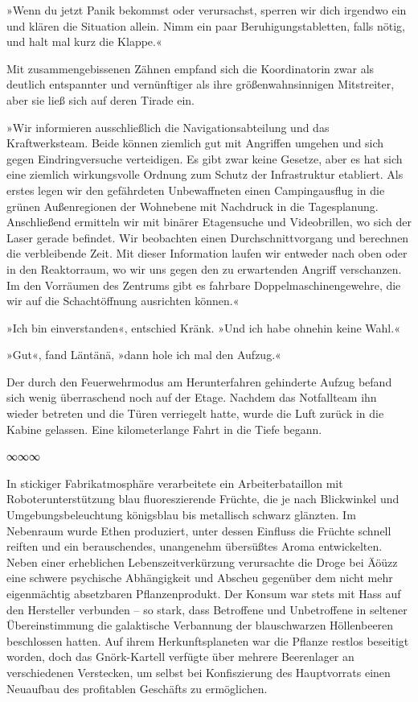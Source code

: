 »Wenn du jetzt Panik bekommst oder verursachst, sperren wir dich irgendwo ein und klären die Situation allein. Nimm ein paar Beruhigungstabletten, falls nötig, und halt mal kurz die Klappe.«

Mit zusammengebissenen Zähnen empfand sich die Koordinatorin zwar als deutlich entspannter und vernünftiger als ihre größenwahnsinnigen Mitstreiter, aber sie ließ sich auf deren Tirade ein.

»Wir informieren ausschließlich die Navigationsabteilung und das Kraftwerksteam. Beide können ziemlich gut mit Angriffen umgehen und sich gegen Eindringversuche verteidigen. Es gibt zwar keine Gesetze, aber es hat sich eine ziemlich wirkungsvolle Ordnung zum Schutz der Infrastruktur etabliert. Als erstes legen wir den gefährdeten Unbewaffneten einen Campingausflug in die grünen Außenregionen der Wohnebene mit Nachdruck in die Tagesplanung. Anschließend ermitteln wir mit binärer Etagensuche und Videobrillen, wo sich der Laser gerade befindet. Wir beobachten einen Durchschnittvorgang und berechnen die verbleibende Zeit. Mit dieser Information laufen wir entweder nach oben oder in den Reaktorraum, wo wir uns gegen den zu erwartenden Angriff verschanzen. Im den Vorräumen des Zentrums gibt es fahrbare Doppelmaschinengewehre, die wir auf die Schachtöffnung ausrichten können.«

»Ich bin einverstanden«, entschied Kränk. »Und ich habe ohnehin keine Wahl.«

»Gut«, fand Läntänä, »dann hole ich mal den Aufzug.«

Der durch den Feuerwehrmodus am Herunterfahren gehinderte Aufzug befand sich wenig überraschend noch auf der Etage. Nachdem das Notfallteam ihn wieder betreten und die Türen verriegelt hatte, wurde die Luft zurück in die Kabine gelassen. Eine kilometerlange Fahrt in die Tiefe begann.

\begin{center}
	∞∞∞
\end{center}

In stickiger Fabrikatmosphäre verarbeitete ein Arbeiterbataillon mit Roboterunterstützung blau fluoreszierende Früchte, die je nach Blickwinkel und Umgebungsbeleuchtung königsblau bis metallisch schwarz glänzten. Im Nebenraum wurde Ethen produziert, unter dessen Einfluss die Früchte schnell reiften und ein berauschendes, unangenehm übersüßtes Aroma entwickelten. Neben einer erheblichen Lebenszeitverkürzung verursachte die Droge bei Äöüzz eine schwere psychische Abhängigkeit und Abscheu gegenüber dem nicht mehr eigenmächtig absetzbaren Pflanzenprodukt. Der Konsum war stets mit Hass auf den Hersteller verbunden – so stark, dass Betroffene und Unbetroffene in seltener Übereinstimmung die galaktische Verbannung der blauschwarzen Höllenbeeren beschlossen hatten. Auf ihrem Herkunftsplaneten war die Pflanze restlos beseitigt worden, doch das Gnörk-Kartell verfügte über mehrere Beerenlager an verschiedenen Verstecken, um selbst bei Konfiszierung des Hauptvorrats einen Neuaufbau des profitablen Geschäfts zu ermöglichen.

